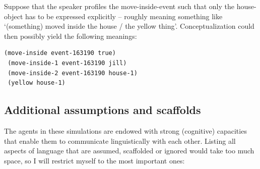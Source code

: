 Suppose that the speaker profiles the move-inside-event such that only the house-object has to be expressed explicitly -- roughly meaning something like `(something) moved inside the house / the yellow thing'. Conceptualization could then possibly yield the following meanings:

\ea
\label{facts3}
\begin{lstlisting} 
(move-inside event-163190 true)
 (move-inside-1 event-163190 jill)
 (move-inside-2 event-163190 house-1)
 (yellow house-1)
\end{lstlisting}
\z

\subsection{Additional assumptions and scaffolds}
\label{s:assumptions}

The agents in these simulations are endowed with strong (cognitive) capacities that enable them to communicate linguistically with each other. Listing all aspects of language that are assumed, scaffolded or ignored would take too much space, so I will restrict myself to the most important ones:

